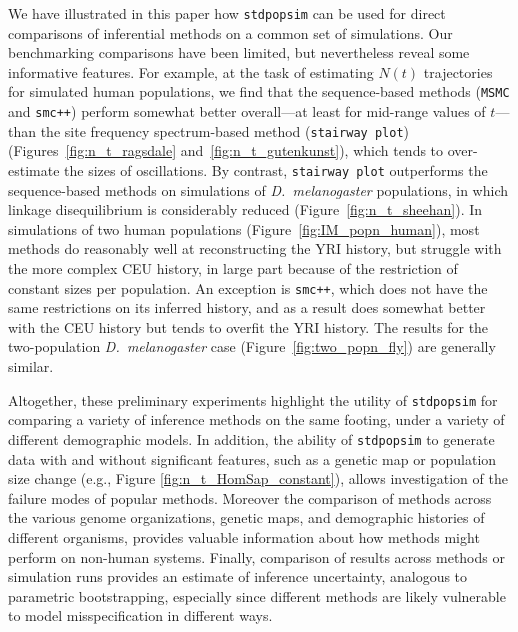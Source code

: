 \documentclass[12pt,halfline,a4paper]{ouparticle}
\newcommand{\stdpopsim}{\texttt{stdpopsim}\xspace}
\newcommand{\MSMC}{\texttt{MSMC}\xspace}
\newcommand{\smcpp}{\texttt{smc++}\xspace}
\newcommand{\stairwayplot}{\texttt{stairway plot}\xspace}
\begin{document}


We have illustrated in this paper how \stdpopsim can be used for direct
comparisons of inferential methods on a common set of simulations. Our
benchmarking comparisons have been limited, but nevertheless
reveal some informative features. For
example, at the task of estimating $N(t)$ trajectories for simulated human
populations, we find that the sequence-based methods (\MSMC and \smcpp)
perform somewhat better overall---at least for mid-range values of
$t$---than the site frequency spectrum-based method (\stairwayplot)
(Figures~\ref{fig:n_t_ragsdale} and~\ref{fig:n_t_gutenkunst}), which
tends to over-estimate the sizes of oscillations.  By contrast,
\stairwayplot outperforms the sequence-based methods
on simulations of \textit{D.~melanogaster} populations,
in which linkage disequilibrium is considerably reduced (Figure~\ref{fig:n_t_sheehan}).
In simulations of two human populations
(Figure~\ref{fig:IM_popn_human}), most methods do reasonably well at
reconstructing the YRI history, but struggle with the more complex CEU
history, in large part because of the restriction of constant sizes per
population.  An exception is \smcpp, which does not have the same
restrictions on its inferred history, and as a result does somewhat better
with the CEU history but tends to overfit the YRI history.  The results for
the two-population \textit{D.~melanogaster} case (Figure~\ref{fig:two_popn_fly})
are generally similar.

Altogether, these preliminary experiments highlight
the utility of \stdpopsim for comparing a variety of inference methods on
the same footing, under a variety of different demographic models.
In addition, the ability of \stdpopsim to generate data with and without significant features, such
as a genetic map or population size change (e.g., Figure \ref{fig:n_t_HomSap_constant}), allows
investigation of the failure modes of popular methods.
Moreover the comparison of methods across the various genome organizations, genetic maps,
and demographic histories of different organisms, provides valuable information
about how methods might perform on non-human systems.
Finally, comparison of results across methods or simulation runs
provides an estimate of inference uncertainty, analogous to parametric
bootstrapping,
especially since different methods are likely vulnerable to model misspecification
in different ways.
\end{document}
